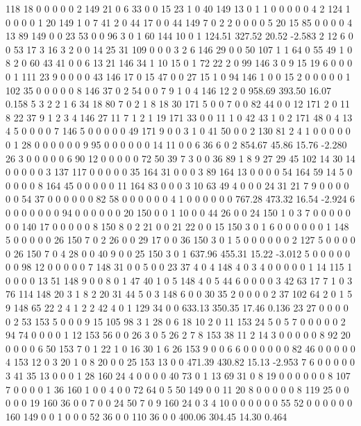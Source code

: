  118 18 0 0 0 0 0 2 149 21 0 6 33 0 0 15 23 1 0 40
 149 13 0 1 1 0 0 0 0 0 4 2 124 1 0 0 0 0 1 20
 149 1 0 7 41 2 0 44 17 0 0 44 149 7 0 2 2 0 0 0
 0 5 20 15 85 0 0 0 0 4 13 89 149 0 0 23 53 0 0 96
 3 0 1 60 144 10 0 1
124.51 327.52 20.52 -2.583
 2 12 6 0 0 53 17 3 16 3 2 0 0 14 25 31 109 0 0 0
 3 2 6 146 29 0 0 50 107 1 1 64 0 55 49 1 0 8 2 0
 60 43 41 0 0 6 13 21 146 34 1 10 15 0 1 72 22 2 0 99
 146 3 0 9 15 19 6 0 0 0 0 1 111 23 9 0 0 0 0 43
 146 17 0 15 47 0 0 27 15 1 0 94 146 1 0 0 15 2 0 0
 0 0 0 1 102 35 0 0 0 0 0 8 146 37 0 2 54 0 0 7
 9 1 0 4 146 12 2 0
958.69 393.50 16.07 0.158
 5 3 2 2 1 6 34 18 80 7 0 2 1 8 18 30 171 5 0 0
 7 0 0 82 44 0 0 12 171 2 0 11 8 22 37 9 1 2 3 4
 146 27 11 7 1 2 1 19 171 33 0 0 11 1 0 42 43 1 0 2
 171 48 0 4 13 4 5 0 0 0 0 7 146 5 0 0 0 0 0 49
 171 9 0 0 3 1 0 41 50 0 0 2 130 81 2 4 1 0 0 0
 0 0 0 1 28 0 0 0 0 0 0 9 95 0 0 0 0 0 0 14
 11 0 0 6 36 6 0 2
854.67 45.86 15.76 -2.280
 26 3 0 0 0 0 0 6 90 12 0 0 0 0 0 72 50 39 7 3
 0 0 36 89 1 8 9 27 29 45 102 14 30 14 0 0 0 0 0 3
 137 117 0 0 0 0 0 35 164 31 0 0 0 3 89 164 13 0 0 0
 0 54 164 59 14 5 0 0 0 0 0 8 164 45 0 0 0 0 0 11
 164 83 0 0 0 3 10 63 49 4 0 0 0 24 31 21 7 9 0 0
 0 0 0 0 54 37 0 0 0 0 0 0 82 58 0 0 0 0 0 0
 4 1 0 0 0 0 0 0
767.28 473.32 16.54 -2.924
 6 0 0 0 0 0 0 0 94 0 0 0 0 0 0 20 150 0 0 1
 10 0 0 44 26 0 0 24 150 1 0 3 7 0 0 0 0 0 0 0
 140 17 0 0 0 0 0 8 150 8 0 2 21 0 0 21 22 0 0 15
 150 3 0 1 6 0 0 0 0 0 0 1 148 5 0 0 0 0 0 26
 150 7 0 2 26 0 0 29 17 0 0 36 150 3 0 1 5 0 0 0
 0 0 0 2 127 5 0 0 0 0 0 26 150 7 0 4 28 0 0 40
 9 0 0 25 150 3 0 1
637.96 455.31 15.22 -3.012
 5 0 0 0 0 0 0 0 98 12 0 0 0 0 0 7 148 31 0 0
 5 0 0 23 37 4 0 4 148 4 0 3 4 0 0 0 0 0 1 14
 115 1 0 0 0 0 13 51 148 9 0 0 8 0 1 47 40 1 0 5
 148 4 0 5 44 6 0 0 0 0 3 42 63 17 7 1 0 3 76 114
 148 20 3 1 8 2 20 31 44 5 0 3 148 6 0 0 30 35 2 0
 0 0 0 2 37 102 64 2 0 1 5 9 148 65 22 2 4 1 2 2
 42 4 0 1 129 34 0 0
633.13 350.35 17.46 0.136
 23 27 0 0 0 0 0 2 53 153 5 0 0 0 9 15 105 98 3 1
 28 0 6 18 10 2 0 11 153 24 5 0 5 7 0 0 0 0 0 2
 94 74 0 0 0 0 1 12 153 56 0 0 26 3 0 5 26 2 7 8
 153 38 11 2 14 3 0 0 0 0 0 8 92 20 0 0 0 0 6 50
 153 7 0 1 22 1 0 16 30 1 6 26 153 9 0 0 6 6 0 0
 0 0 0 0 82 46 0 0 0 0 0 4 153 12 0 3 20 1 0 8
 20 0 0 25 153 13 0 0
471.39 430.82 15.13 -2.953
 7 6 0 0 0 0 0 3 41 35 13 0 0 0 1 28 160 24 4 0
 0 0 0 40 73 0 1 13 69 31 0 8 19 0 0 0 0 0 0 8
 107 7 0 0 0 0 1 36 160 1 0 0 4 0 0 72 64 0 5 50
 149 0 0 11 20 8 0 0 0 0 0 8 119 25 0 0 0 0 0 19
 160 36 0 0 7 0 0 24 50 7 0 9 160 24 0 3 4 10 0 0
 0 0 0 0 55 52 0 0 0 0 0 0 160 149 0 0 1 0 0 0
 52 36 0 0 110 36 0 0
400.06 304.45 14.30 0.464

